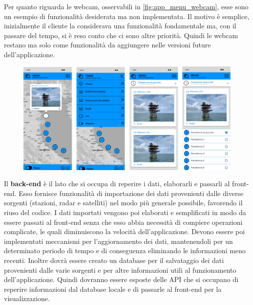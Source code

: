 \documentclass[./main.tex]{subfiles}
\begin{document}
Per quanto riguarda le webcam, osservabili in \autoref{fig:app_menu_webcam}, esse sono un esempio di funzionalità desiderata ma non implementata. Il motivo è semplice, inizialmente il cliente la considerava una funzionalità fondamentale ma, con il passare del tempo, si è reso conto che ci sono altre priorità. Quindi le webcam restano ma solo come funzionalità da aggiungere nelle versioni future dell'applicazione. 

\begin{figure}[!ht]
\noindent\begin{minipage}{\textwidth}
\vspace{1cm}
\includegraphics[width=\textwidth]{images/app_ismar_data_webcam.pdf}
\captionsetup{font=small, hypcap=false}
\label{fig:app_menu_webcam}
\end{minipage}
\vspace{0.25cm}
\end{figure}

Il \textbf{back-end} è il lato che si occupa di reperire i dati, elaborarli e passarli al front-end. Esso fornisce funzionalità di importazione dei dati provenienti dalle diverse sorgenti (stazioni, radar e satelliti) nel modo più generale possibile, favorendo il riuso del codice. I dati importati vengono poi elaborati e semplificati in modo da essere passati al front-end senza che esso abbia necessità di compiere operazioni complicate, le quali diminuiscono la velocità dell'applicazione. Devono essere poi implementati meccanismi per l'aggiornamento dei dati, mantenendoli per un determinato periodo di tempo e di conseguenza eliminando le informazioni meno recenti. Inoltre dovrà essere creato un database per il salvataggio dei dati provenienti dalle varie sorgenti e per altre informazioni utili al funzionamento dell'applicazione. Quindi dovranno essere esposte delle API che si occupano di reperire informazioni dal database locale e di passarle al front-end per la visualizzazione.\par
\end{document}
